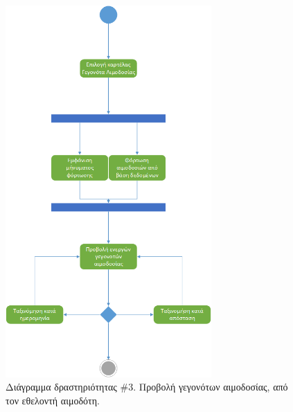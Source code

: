 		\begin{figure}[H]
		    \centering
		    \includegraphics[width=0.7\textwidth]{ViewDonationEvents.png}
		    \caption{Διάγραμμα δραστηριότητας \#3. Προβολή γεγονότων αιμοδοσίας, από τον εθελοντή αιμοδότη.}
		    \label{fig:view}
		\end{figure}
		
